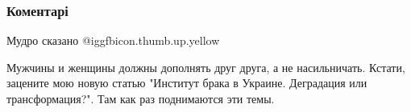  
 
 
 
 
\subsubsection{Коментарі}
\label{sec:23_10_2021.fb.zharkih_denis.3.semja_muzhchina_zhenschina.cmt}

\begin{itemize} %
Мудро сказано  @igg{fbicon.thumb.up.yellow} 


Мужчины и женщины должны дополнять друг друга, а не насильничать. Кстати,
зацените мою новую статью "Институт брака в Украине. Деградация или
трансформация?". Там как раз поднимаются эти темы.

\end{itemize} %

